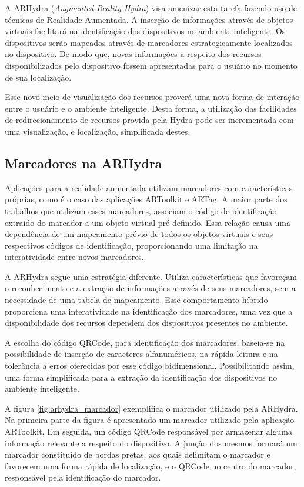     A ARHydra (\textit{Augmented Reality Hydra}) visa amenizar esta tarefa fazendo uso de técnicas de
    Realidade Aumentada. A inserção de informações através de objetos virtuais facilitará na
    identificação dos dispositivos no ambiente inteligente. Os dispositivos serão mapeados através de
    marcadores estrategicamente localizados no dispositivo. De modo que, novas informações a
    respeito dos recursos disponibilizados pelo dispositivo fossem apresentadas para o usuário no
    momento de sua localização.
    
    Esse novo meio de visualização dos recursos proverá uma nova forma de interação entre o
    usuário e o ambiente inteligente. Desta forma, a utilização das facilidades de redirecionamento
    de recursos provida pela Hydra pode ser incrementada com uma visualização, e localização,
    simplificada destes.
    
\subsection{Marcadores na ARHydra}

	Aplicações para a realidade aumentada utilizam marcadores com características próprias, como é
	o caso das aplicações ARToolkit e ARTag. A maior parte dos trabalhos que utilizam esses
	marcadores, associam o código de identificação extraído do marcador a um objeto virtual
	pré-definido. Essa relação causa uma dependência de um mapeamento prévio de todos os objetos 
	virtuais e seus respectivos códigos de identificação, proporcionando uma limitação na interatividade 
	entre novos marcadores.
	
	A ARHydra segue uma estratégia diferente. Utiliza características que favoreçam o reconhecimento e
	a extração de informações através de seus marcadores, sem a necessidade de uma tabela de
	mapeamento. Esse comportamento híbrido proporciona uma interatividade na identificação dos
	marcadores, uma vez que a disponibilidade dos recursos dependem dos dispositivos presentes no
	ambiente.
	 
	A escolha do código QRCode, para identificação dos marcadores, baseia-se na possibilidade de
	inserção de caracteres alfanuméricos, na rápida leitura e na tolerância a erros oferecidas por
	esse código bidimensional. Possibilitando assim, uma forma simplificada para a extração da
	identificação dos dispositivos no ambiente inteligente. 
	
	A figura \ref{fig:arhydra_marcador} exemplifica o marcador utilizado pela ARHydra. Na primeira
	parte da figura é apresentado um marcador utilizado pela aplicação ARToolkit. Em seguida, um
	código QRCode responsável por armazenar alguma informação relevante a respeito do dispositivo. A
	junção dos mesmos formará um marcador constituído de bordas pretas, aos quais delimitam o marcador
	e favorecem uma forma rápida de localização, e o QRCode no centro do marcador, responsável pela
	identificação do marcador.
	
